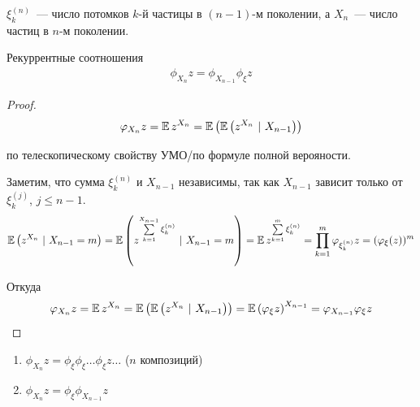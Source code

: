 \begin{note} $\xi_k^{(n)}$~--- число потомков $k$-й частицы в $(n - 1)$-м поколении, а $X_n$~--- число частиц в $n$-м поколении.
\end{note}

\begin{lemma} Рекуррентные соотношения
\begin{gather*}
    \phi_{X_n}{z} = \phi_{X_{n - 1}}{\phi_{\xi}{z}}
\end{gather*}
\end{lemma}

\begin{proof}
\begin{equation*}
    \varphi_{X_n}{z} = \operatorname{\mathbb{E}} z^{X_n} = \operatorname{\mathbb{E}}\left({\operatorname{\mathbb{E}}\left({z^{X_n} \ | \ X_{n - 1}}\right)}\right)
\end{equation*}

по телескопическому свойству УМО/по формуле полной верояности.

Заметим, что сумма $\xi_k^{(n)}$ и $X_{n - 1}$ независимы, так как $X_{n - 1}$ зависит только от $\xi_k^{(j)}$, $j \leq n - 1$.
\begin{equation*}
    \operatorname{\mathbb{E}}\left({z^{X_n} \ | \ X_{n - 1} = m}\right) = \operatorname{\mathbb{E}}\left({z^{\sum\limits_{k = 1}^{X_{n - 1}} \xi_k^{(n)}} \ | \ X_{n - 1} = m}\right) = \operatorname{\mathbb{E}}{z^{\sum\limits_{k = 1}^{m} \xi_k^{(n)}}} = \prod\limits_{k = 1}^m \varphi_{\xi_k^{(n)}}{z} = (\varphi_{\xi}(z))^m
\end{equation*}

Откуда
\begin{equation*}
    \varphi_{X_n}{z} = \operatorname{\mathbb{E}} z^{X_n} = \operatorname{\mathbb{E}}\left({\operatorname{\mathbb{E}}\left({z^{X_n} \ | \ X_{n - 1}}\right)}\right) = \operatorname{\mathbb{E}}\left({\varphi_{\xi}{z}}\right)^{X_{n - 1}} = \varphi_{X_{n - 1}}{\varphi_{\xi}{z}}
\end{equation*}
\end{proof}

\begin{corollary}
\begin{enumerate}
    \item $\phi_{X_n}{z} = \phi_{\xi}{\phi_{\xi}{\ldots\phi_{\xi}{z}}\ldots}$ ($n$ композиций)
    \item $\phi_{X_n}{z} = \phi_{\xi}{\phi_{X_{n - 1}}{z}}$
\end{enumerate}
\end{corollary}
